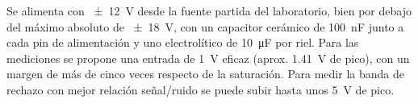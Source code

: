 Se alimenta con \qty{\pm 12}{\volt} desde la fuente partida del laboratorio, bien por debajo del máximo absoluto de \qty{\pm 18}{\volt}, con un
capacitor cerámico de \qty{100}{\nano\farad} junto a cada pin de alimentación y uno electrolítico de \qty{10}{\micro\farad} por riel. Para las
mediciones se propone una entrada de \qty{1}{\volt} eficaz (aprox. \qty{1.41}{\volt} de pico), con un margen de más de cinco veces respecto de la
saturación. Para medir la banda de rechazo con mejor relación señal/ruido se puede subir hasta unos \qty{5}{\volt} de pico.

\begin{table}[H]
  \centering\footnotesize
  \caption{Lista de materiales. En el filtro se usan capacitores de film (poliéster/MKT) o cerámicos C0G; se evitan los cerámicos de alta constante
  dieléctrica, cuyo valor varía con la tensión y la temperatura. Las resistencias indicadas con «+» se conectan en serie.}
  \label{tab:bom}
\end{table}
